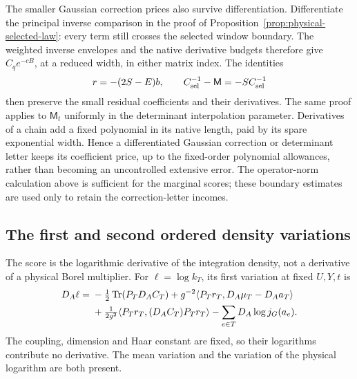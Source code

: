 \documentclass[11pt,reqno]{amsart}
\numberwithin{equation}{section}
\theoremstyle{definition}
\theoremstyle{remark}
\begin{document}
The smaller Gaussian correction prices also survive
differentiation. Differentiate the principal inverse comparison
in the proof of Proposition~\ref{prop:physical-selected-law}:
every term still crosses the selected window boundary. The
weighted inverse envelopes and the native derivative budgets
therefore give \(C_qe^{-cB}\), at a reduced width, in either
matrix index. The identities
\[
 r=-(2S-E)b,\qquad C_{\rm sel}^{-1}-\mathsf M=-S C_{\rm sel}^{-1}
\]
then preserve the small residual coefficients and their
derivatives. The same proof applies to \(\mathsf M_t\)
uniformly in the determinant interpolation parameter.
Derivatives of a chain add a fixed polynomial in its native
length, paid by its spare exponential width. Hence a
differentiated Gaussian correction or determinant letter keeps
its coefficient price, up to the fixed-order polynomial
allowances, rather than becoming an uncontrolled extensive
error. The operator-norm calculation above is sufficient for
the marginal scores; these boundary estimates are used only to
retain the correction-letter incomes.


\subsection{The first and second ordered density variations}

The score is the logarithmic derivative of the integration
density, not a derivative of a physical Borel multiplier.
For \(\ell=\log k_T\), its first variation at fixed
\(U,Y,t\) is
\begin{align}
 D_A\ell={}&-\tfrac12\operatorname{Tr}(P_TD_AC_T)
       +g^{-2}\langle P_Tr_T,D_A\mu_T-D_Aa_T\rangle\notag\\
 &+\tfrac1{2g^2}\langle P_Tr_T,(D_AC_T)P_Tr_T\rangle
                         -\sum_{e\in T}D_A\log j_G(a_e).
 \label{eq:output-first-score}
\end{align}
The coupling, dimension and Haar constant are fixed, so their
logarithms contribute no derivative. The mean variation and
the variation of the physical logarithm are both present.
\end{document}
